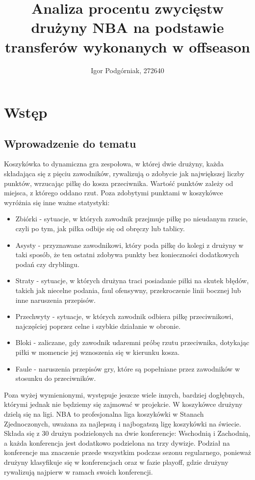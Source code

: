 \documentclass{article}
\title{Analiza procentu zwycięstw drużyny NBA na podstawie transferów wykonanych w offseason}
\author{Igor Podgórniak, 272640}
\begin{document}
\maketitle


\section{Wstęp}
\subsection{Wprowadzenie do tematu}
Koszykówka to dynamiczna gra zespołowa, w której dwie drużyny, każda składająca się z pięciu zawodników, rywalizują o zdobycie jak największej liczby punktów, wrzucając piłkę do kosza przeciwnika. Wartość punktów zależy od miejsca, z którego oddano rzut. Poza zdobytymi punktami w koszykówce wyróżnia się inne ważne statystyki:
\begin{itemize}
    \item Zbiórki - sytuacje, w których zawodnik przejmuje piłkę po nieudanym rzucie, czyli po tym, jak piłka odbije się od obręczy lub tablicy.
    \item Asysty - przyznawane zawodnikowi, który poda piłkę do kolegi z drużyny w taki sposób, że ten ostatni zdobywa punkty bez konieczności dodatkowych podań czy dryblingu.
    \item Straty - sytuacje, w których drużyna traci posiadanie piłki na skutek błędów, takich jak niecelne podania, faul ofensywny, przekroczenie linii bocznej lub inne naruszenia przepisów.
    \item Przechwyty - sytuacje, w których zawodnik odbiera piłkę przeciwnikowi, najczęściej poprzez celne i szybkie działanie w obronie.
    \item Bloki - zaliczane, gdy zawodnik udaremni próbę rzutu przeciwnika, dotykając piłki w momencie jej wznoszenia się w kierunku kosza.
    \item Faule - naruszenia przepisów gry, które są popełniane przez zawodników w stosunku do przeciwników.
\end{itemize} Poza wyżej wymienionymi, występuje jeszcze wiele innych, bardziej dogłębnych, którymi jednak nie będziemy się zajmować w projekcie. 
W koszykówce drużyny dzielą się na ligi. NBA to profesjonalna liga koszykówki w Stanach Zjednoczonych, uważana za najlepszą i najbogatszą ligę koszykówki na świecie. Składa się z 30 drużyn podzielonych na dwie konferencje: Wschodnią i Zachodnią, a każda konferencja jest dodatkowo podzielona na trzy dywizje. Podział na konferencje ma znaczenie przede wszystkim podczas sezonu regularnego, ponieważ drużyny klasyfikuje się w konferencjach oraz w fazie playoff, gdzie drużyny rywalizują najpierw w ramach swoich konferencji. \newline
\end{document}
